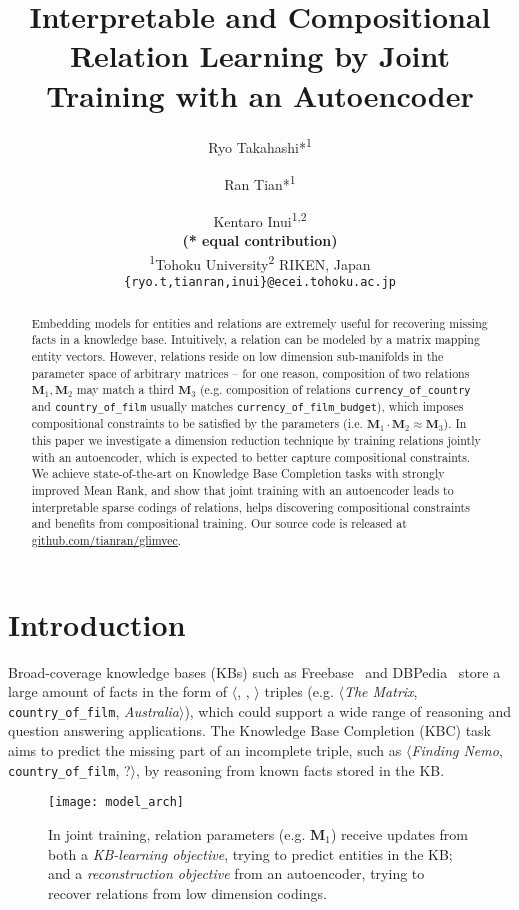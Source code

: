\documentclass[11pt,a4paper]{article}
\title{Interpretable and Compositional Relation Learning by Joint Training with an Autoencoder}
\author{Ryo Takahashi*\textsuperscript{1} \and
  Ran Tian*\textsuperscript{1} \and
  Kentaro Inui\textsuperscript{1,2}\\
  {\bf (* equal contribution)}\\
  \textsuperscript{1}Tohoku University\quad\textsuperscript{2} RIKEN, 
  \quad Japan \\
  {\tt \{ryo.t,\;tianran,\;inui\}@ecei.tohoku.ac.jp}
  \\}
\date{}
\newcommand{\mat}[1]{\bm{#1}}
\begin{document}
\maketitle
\begin{abstract}
Embedding models for entities and relations are extremely 
useful for recovering missing facts in a knowledge base. Intuitively, a relation can be modeled by 
a matrix mapping entity vectors. However, relations reside 
on low dimension sub-manifolds in the parameter space of arbitrary matrices -- 
for one reason, composition of two relations $\mat{M}_1,\mat{M}_2$ may match a third $\mat{M}_3$
(e.g. composition of relations \texttt{currency\_of\_country} and \texttt{country\_of\_film} usually matches 
\texttt{currency\_of\_film\_budget}), which imposes compositional 
constraints to be satisfied by the parameters (i.e. $\mat{M}_1\cdot \mat{M}_2\approx \mat{M}_3$). 
In this paper we investigate a dimension reduction technique by training relations 
jointly with an autoencoder, which is expected to 
better capture compositional 
constraints. We achieve state-of-the-art on Knowledge Base Completion 
tasks with strongly improved Mean Rank, and show that joint training with 
an autoencoder leads to interpretable sparse codings of relations, helps discovering 
compositional constraints and benefits from compositional training. Our source code is released at
\url{github.com/tianran/glimvec}.
\end{abstract}

\section{Introduction}

Broad-coverage knowledge bases (KBs) such as %
Freebase~\citep{DBLP:conf/sigmod/BollackerEPST08} and 
DBPedia~\citep{auer2007dbpedia}
store a large amount of facts 
in the form of 
$\langle$, , $\rangle$ triples 
(e.g. $\langle$\textit{The Matrix}, \texttt{country\_of\_film}, 
\textit{Australia}$\rangle$), which 
could support a wide range of reasoning and question answering applications. 
The Knowledge Base Completion (KBC) task aims to predict the missing part of an incomplete triple, 
such as $\langle$\textit{Finding Nemo}, \texttt{country\_of\_film}, ?$\rangle$, by reasoning 
from known facts stored in the KB.

\begin{figure}[!t]
\centering
\texttt{[image: model\_arch]}
\caption{In joint training, relation parameters (e.g. $\mat{M}_1$) 
receive updates from both
a \emph{KB-learning objective}, trying to predict entities in the KB; 
and 
a \emph{reconstruction objective} from an autoencoder, trying to 
recover relations from low dimension codings.}
\label{fig:model_arch}
\end{figure}
\end{document}

